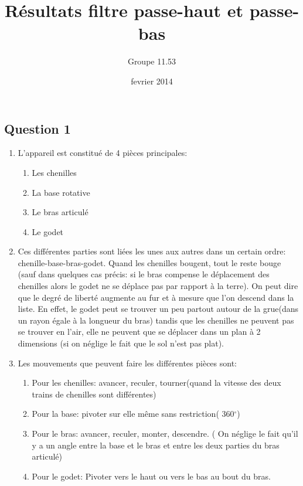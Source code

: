 \documentclass{report}
\title{Résultats filtre passe-haut et passe-bas}
\author{Groupe 11.53}
\date{fevrier 2014}
\begin{document}
 
\maketitle

\chapter{}
\section{Question 1}
\begin{enumerate}
\item L'appareil est constitué de 4 pièces principales:
      \begin{enumerate}
      \item Les chenilles
			\item La base rotative
			\item Le bras articulé
			\item Le godet
			\end{enumerate}
\item Ces différentes parties sont liées les unes aux autres dans un certain ordre: chenille-base-bras-godet.
      Quand les chenilles bougent, tout le reste bouge (sauf dans quelques cas précis: si le bras compense le déplacement des chenilles alors le godet ne se déplace pas par rapport à la terre).
			On peut dire que le degré de liberté augmente au fur et à mesure que l'on descend dans la liste.  En effet, le godet peut se trouver un peu partout autour de la grue(dans un rayon égale à la longueur du bras) tandis que les chenilles ne peuvent pas se trouver en l'air, elle ne peuvent que se déplacer dans un plan à 2 dimensions (si on néglige le fait que le sol n'est pas plat).
			\item Les mouvements que peuvent faire les différentes pièces sont:
			\begin{enumerate}
			\item Pour les chenilles: avancer, reculer, tourner(quand la vitesse des deux trains de chenilles sont différentes)
			\item Pour la base: pivoter sur elle même sans restriction( 360$^{\circ}$)
			\item Pour le bras: avancer, reculer, monter, descendre. ( On néglige le fait qu'il y a un angle entre la base et le bras et entre les deux parties du bras articulé)
			\item Pour le godet: Pivoter vers le haut ou vers le bas au bout du bras.
			

\end{enumerate}
\end{enumerate}
\end{document}
